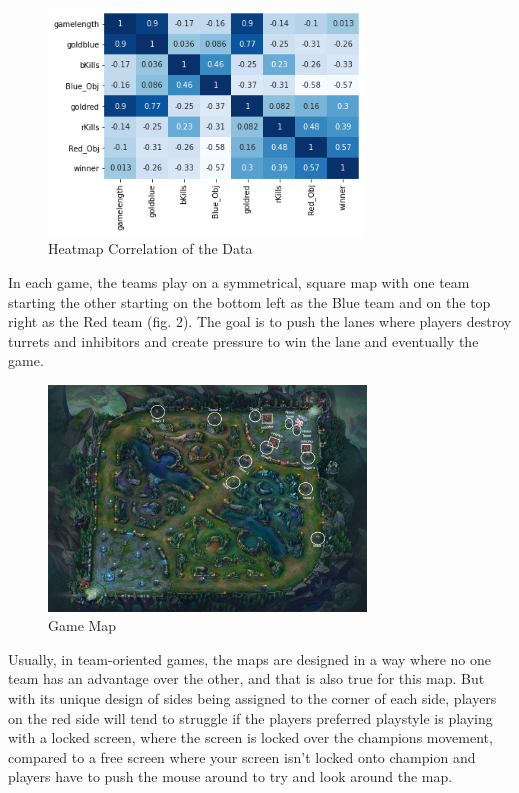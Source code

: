 \documentclass[conference]{IEEEtran}
\begin{document}
\begin{figure}[!ht]
  \begin{center}
 \includegraphics[height=6cm]{graphics/corr.png}
 \caption{Heatmap Correlation of the Data}
 \label{Heatmap Correlation of the Data}
 \end{center}
\end{figure}

In each game, the teams play on a symmetrical, square map with one team starting the other starting on the bottom left as the Blue team and on the top right as the Red team (fig. 2). The goal is to push the lanes where players destroy turrets and inhibitors and create pressure to win the lane and eventually the game.

\begin{figure}[!ht]
  \begin{center}
 \includegraphics[height=6cm]{graphics/map.jpg}
 \caption{Game Map}
 \label{Game Map}
 \end{center}
\end{figure}

Usually, in team-oriented games, the maps are designed in a way where no one team has an advantage over the other, and that is also true for this map. But with its unique design of sides being assigned to the corner of each side, players on the red side will tend to struggle if the players preferred playstyle is playing with a locked screen, where the screen is locked over the champions movement, compared to a free screen where your screen isn't locked onto champion and players have to push the mouse around to try and look around the map. 
\end{document}
